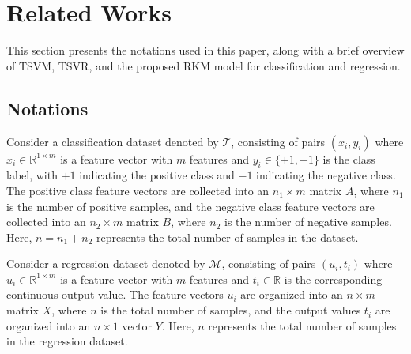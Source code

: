\section{Related Works}
This section presents the notations used in this paper, along with a brief overview of TSVM, TSVR, and the proposed RKM model for classification and regression.

\subsection{Notations}
Consider a classification dataset denoted by \(\mathscr{T}\), consisting of pairs \((x_i, y_i)\) where \(x_i \in \mathbb{R}^{1 \times m}\) is a feature vector with \(m\) features and \(y_i \in \{+1, -1\}\) is the class label, with \(+1\) indicating the positive class and \(-1\) indicating the negative class. The positive class feature vectors are collected into an \(n_1 \times m\) matrix \(A\), where \(n_1\) is the number of positive samples, and the negative class feature vectors are collected into an \(n_2 \times m\) matrix \(B\), where \(n_2\) is the number of negative samples. Here, \(n = n_1 + n_2\) represents the total number of samples in the dataset.

Consider a regression dataset denoted by \(\mathscr{M} \), consisting of pairs \((u_i, t_i)\) where \(u_i \in \mathbb{R}^{1 \times m}\) is a feature vector with \(m\) features and \(t_i \in \mathbb{R}\) is the corresponding continuous output value. The feature vectors \(u_i\) are organized into an \(n \times m\) matrix \(X\), where \(n\) is the total number of samples, and the output values \(t_i\) are organized into an \(n \times 1\) vector \(Y\). Here, \(n\) represents the total number of samples in the regression dataset.

